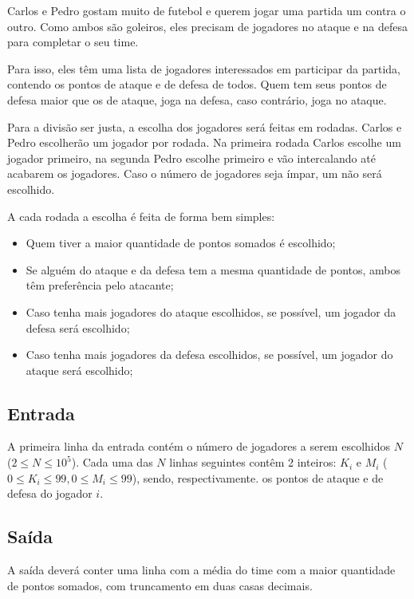     Carlos e Pedro gostam muito de futebol e querem jogar uma partida um contra o outro. Como ambos são goleiros, eles precisam de jogadores no ataque e na defesa para completar o seu time.

    Para isso, eles têm uma lista de jogadores interessados em participar da partida, contendo os
pontos de ataque e de defesa de todos. Quem tem seus pontos de defesa maior que os de ataque, joga na defesa,
caso contrário, joga no ataque.

    Para a divisão ser justa, a escolha dos jogadores será feitas em rodadas. Carlos e Pedro escolherão um jogador por rodada.
Na primeira rodada Carlos escolhe um jogador primeiro, na segunda Pedro escolhe primeiro e vão intercalando até acabarem os jogadores. Caso o número de jogadores
seja ímpar, um não será escolhido.

    A cada rodada a escolha é feita de forma bem simples:
\begin{itemize}
    \item Quem tiver a maior quantidade de pontos somados é escolhido;
    \item Se alguém do ataque e da defesa tem a mesma quantidade de pontos, ambos têm preferência pelo atacante;
    \item Caso tenha mais jogadores do ataque escolhidos, se possível, um jogador da defesa será escolhido;
    \item Caso tenha mais jogadores da defesa escolhidos, se possível, um jogador do ataque será escolhido;
\end{itemize}

\subsection*{Entrada}

A primeira linha da entrada contém o número de jogadores a serem escolhidos $N$ ($2\leq N\leq 10^5$).
Cada uma das $N$ linhas seguintes contêm 2 inteiros: $K_i$ e $M_i$ ($0\leq K_i\leq 99, 0\leq M_i\leq 99$), sendo, respectivamente. os pontos de ataque
e de defesa do jogador $i$.  

\subsection*{Saída}

A saída deverá conter uma linha com a média do time com a maior quantidade de pontos somados, com truncamento em duas casas decimais.


